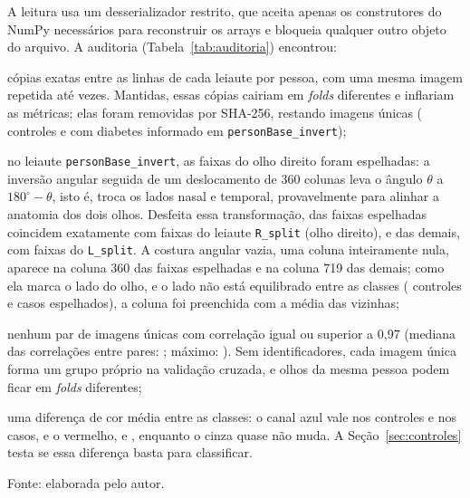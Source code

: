 A leitura usa um desserializador restrito, que aceita apenas os construtores
do NumPy necessários para reconstruir os arrays e bloqueia qualquer outro
objeto do arquivo. A auditoria (Tabela~\ref{tab:auditoria}) encontrou:
\begin{alineas}
  \item {} cópias exatas entre as  linhas de
  cada leiaute por pessoa, com uma mesma imagem repetida até
   vezes. Mantidas, essas cópias cairiam em \emph{folds}
  diferentes e inflariam as métricas; elas foram removidas por SHA-256,
  restando  imagens únicas ( controles e
   com diabetes informado em \texttt{personBase\_invert});
  \item no leiaute \texttt{personBase\_invert}, as faixas do olho direito
  foram espelhadas: a inversão angular seguida de um deslocamento de 360
  colunas leva o ângulo $\theta$ a $180^\circ-\theta$, isto é, troca os lados
  nasal e temporal, provavelmente para alinhar a anatomia dos dois olhos.
  Desfeita essa transformação,  das
   faixas espelhadas coincidem exatamente com faixas do
  leiaute \texttt{R\_split} (olho direito), e 
  das  demais, com faixas do \texttt{L\_split}. A
  costura angular vazia, uma coluna inteiramente nula, aparece na coluna 360
  das faixas espelhadas e na coluna 719 das demais; como ela marca o lado do
  olho, e o lado não está equilibrado entre as classes (
  controles e  casos espelhados), a coluna foi
  preenchida com a média das vizinhas;
  \item nenhum par de imagens únicas com correlação igual ou superior a 0,97
  (mediana das correlações entre pares: ; máximo:
  ). Sem identificadores, cada imagem única forma um grupo
  próprio na validação cruzada, e olhos da mesma pessoa podem ficar em
  \emph{folds} diferentes;
  \item uma diferença de cor média entre as classes: o canal azul vale
   nos controles e  nos casos, e o
  vermelho,  e , enquanto o cinza
  quase não muda. A Seção~\ref{sec:controles} testa se essa diferença basta
  para classificar.
\end{alineas}

\begin{table}[htb]
  \centering
  \caption{Auditoria dos dois leiautes por pessoa da base legada}
  \label{tab:auditoria}
  \footnotesize
  
  \par\medskip
  \footnotesize Fonte: elaborada pelo autor.
\end{table}


